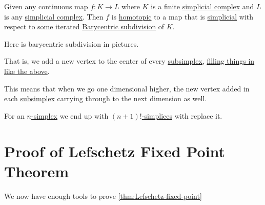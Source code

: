 \begin{theorem}\label{thm:simplicial-approximation-theorem}
	Given any continuous map \(f \colon K \to L\) where \(K\) is a finite \hyperref[def:simplicial-complex]{simplicial complex} and
	\(L\) is any \hyperref[def:simplicial-complex]{simplicial complex}. Then \(f\) is \hyperref[def:homotopic]{homotopic} to a map
	that is \hyperref[def:simplicial-map]{simplicial} with respect to some iterated \hyperref[eg:Barycentric-subdivision]{Barycentric subdivision} of \(K\).
\end{theorem}
\begin{eg}\label{eg:Barycentric-subdivision}
	Here is barycentric subdivision in pictures.
	\begin{figure}[H]
		\centering
		\label{fig:eg:barycentric-subdivision}
	\end{figure}
	That is, we add a new vertex to the center of every \hyperref[def:subsimplex]{subsimplex}, \underline{filling things in like the above}.
	\begin{note}
		This means that when we go one dimensional higher, the new vertex added in each \hyperref[def:subsimplex]{subsimplex} carrying through to the next
		dimension as well.
	\end{note}

	For an \hyperref[def:standard-simplex]{\(n\)-simplex} we end up with \hyperref[def:standard-simplex]{\((n + 1)!\)-simplices} with replace it.
\end{eg}

\section{Proof of Lefschetz Fixed Point Theorem}
We now have enough tools to prove \autoref{thm:Lefschetz-fixed-point}

